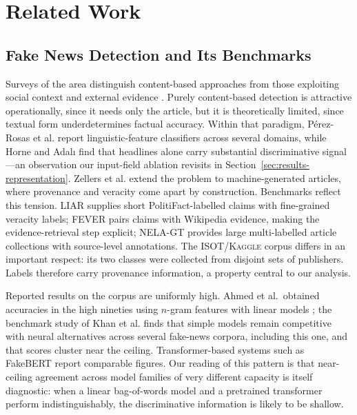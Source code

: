 \documentclass[conference]{IEEEtran}
\newcommand{\dataset}{\textsc{ISOT/Kaggle}}
\begin{document}
\section{Related Work}
\label{sec:related}

\subsection{Fake News Detection and Its Benchmarks}
Surveys of the area distinguish content-based approaches from those exploiting
social context and external evidence
\cite{shu2017fake,zhou2020survey,oshikawa2020survey}. Purely content-based
detection is attractive operationally, since it needs only the article, but it
is theoretically limited, since textual form underdetermines factual accuracy.
Within that paradigm, P\'erez-Rosas et al. \cite{perezrosas2018automatic}
report linguistic-feature classifiers across several domains, while Horne and
Adal{\i} \cite{horne2017this} find that headlines alone carry substantial
discriminative signal---an observation our input-field ablation revisits in
Section~\ref{sec:results-representation}. Zellers et al.
\cite{zellers2019defending} extend the problem to machine-generated articles,
where provenance and veracity come apart by construction. Benchmarks reflect
this tension. LIAR \cite{wang2017liar} supplies short
PolitiFact-labelled claims with fine-grained veracity labels; FEVER
\cite{thorne2018fever} pairs claims with Wikipedia evidence, making the
evidence-retrieval step explicit; NELA-GT \cite{norregaard2019nela} provides
large multi-labelled article collections with source-level annotations. The
\dataset{} corpus \cite{ahmed2017detection,ahmed2018detecting,bisaillon2020dataset}
differs in an important respect: its two classes were collected from disjoint
sets of publishers. Labels therefore carry provenance information, a property
central to our analysis.

Reported results on the corpus are uniformly high. Ahmed et al.\ obtained
accuracies in the high nineties using $n$-gram features with linear models
\cite{ahmed2017detection,ahmed2018detecting}; the benchmark study of Khan et al.
\cite{khan2021benchmark} finds that simple models remain competitive with
neural alternatives across several fake-news corpora, including this one, and
that scores cluster near the ceiling. Transformer-based systems such as
FakeBERT \cite{kaliyar2021fakebert} report comparable figures. Our reading of
this pattern is that near-ceiling agreement across model families of very
different capacity is itself diagnostic: when a linear bag-of-words model and a
pretrained transformer perform indistinguishably, the discriminative
information is likely to be shallow.
\end{document}
